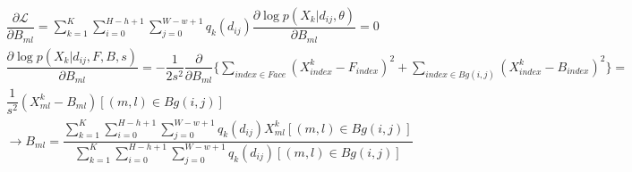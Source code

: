 \begin{gather*}
	\dfrac{\partial \mathcal{L}}{\partial B_{ml}} = \sum_{k=1}^{K} \sum_{i=0}^{H-h+1} \sum_{j=0}^{W-w+1} q_k(d_{ij}) \dfrac{\partial \log p(X_k | d_{ij}, \theta)}{\partial B_{ml}} = 0\\
	\dfrac{\partial \log p(X_k | d_{ij}, F, B, s)}{\partial B_{ml}} = -\dfrac{1}{2 s^2} \dfrac{\partial}{\partial B_{ml}} \bigg\{ \sum_{index \in Face} (X_{index}^k - F_{index})^2 + \sum_{index \in Bg(i, j)} (X_{index}^k - B_{index})^2 \bigg\} = \\ \dfrac{1}{s^2} (X_{ml}^k - B_{ml})[(m, l) \in Bg(i, j)] \\	
	\rightarrow B_{ml} = \dfrac{\sum_{k=1}^{K} \sum_{i=0}^{H-h+1} \sum_{j=0}^{W-w+1} q_k(d_{ij}) X_{ml}^k[(m, l) \in Bg(i, j)]}{\sum_{k=1}^{K} \sum_{i=0}^{H-h+1} \sum_{j=0}^{W-w+1} q_k(d_{ij})[(m, l) \in Bg(i, j)]}
\end{gather*}